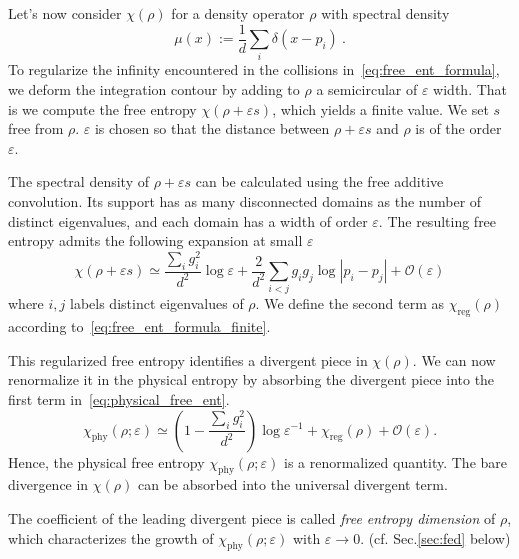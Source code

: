 \documentclass[11pt,letterpaper]{article}
\def\eps{\varepsilon}
\def\O{\mathcal{O}}
\begin{document}
Let's now consider $\chi(\rho)$ for a density operator $\rho$ with spectral density
\begin{equation}
    \mu(x):= \frac1d\sum_i\delta(x-p_i)\ .
\end{equation}
To regularize the infinity encountered in the collisions in~\eqref{eq:free_ent_formula}, we deform the integration contour by adding to $\rho$ a semicircular of $\eps$ width.  That is we compute the free entropy $\chi(\rho+\eps s)$, which yields a finite value. We set $s$ free from $\rho$. $\eps$ is chosen so that the distance between $\rho+\eps s$ and $\rho$ is of the order $\eps$. 

The spectral density of $\rho+\eps s$ can be calculated using the free additive convolution. Its support has as many disconnected domains as the number of distinct eigenvalues, and each domain has a width of order $\eps$. The resulting free entropy admits the following expansion at small $\eps$
\begin{equation}
    \chi(\rho+\eps s) \simeq \frac{\sum_ig_i^2}{d^2}\log\eps + \frac{2}{d^2}\sum_{i<j}g_ig_j\log |p_i-p_j| + \O(\eps)
\end{equation}
where $i,j$ labels distinct eigenvalues of $\rho$. We define the second term as $\chi_\mathrm{reg}(\rho)$ according to~\eqref{eq:free_ent_formula_finite}.

This regularized free entropy identifies a divergent piece in $\chi(\rho)$. We can now renormalize it in the physical entropy by absorbing the divergent piece into the first term in~\eqref{eq:physical_free_ent}. 
\begin{equation}
    \chi_\mathrm{phy}(\rho;\eps)\simeq\left(1-\frac{\sum_ig_i^2}{d^2}\right)\log\eps^{-1} + \chi_\mathrm{reg}(\rho) + \O(\eps).
\end{equation}
Hence, the physical free entropy $\chi_\mathrm{phy}(\rho;\eps)$ is a renormalized quantity. The bare divergence in $\chi(\rho)$ can be absorbed into the universal divergent term.

The coefficient of the leading divergent piece is called \emph{free entropy dimension} of $\rho$, which characterizes the growth of $\chi_\mathrm{phy}(\rho;\eps)$ with $\eps\to 0$. (cf. Sec.\ref{sec:fed} below) \\
\end{document}
